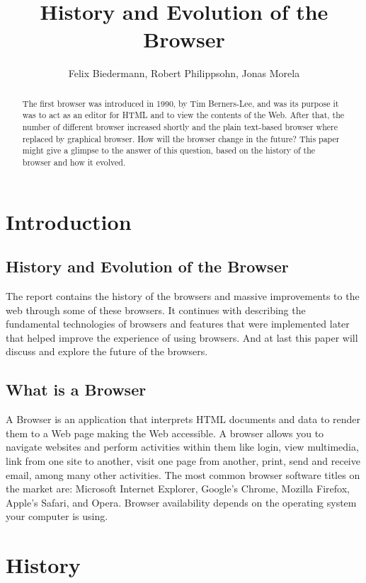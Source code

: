 \documentclass[runningheads]{llncs}
\title{History and Evolution of the Browser}
\author{Felix Biedermann, Robert Philippsohn, Jonas Morela}
\institute{University of Stuttgart, Institute for Architecture of Application Systems \\
Universitätsstraße 38, 70569 Stuttgart, Germany}
\begin{document}
\raggedbottom
\maketitle

	\begin{abstract}
		The first browser was introduced in 1990, by Tim Berners-Lee, and was its purpose it was to act as an editor for HTML and to view the contents of the Web. After that, the number of different browser increased shortly and the plain text-based browser where replaced by graphical browser. How will the browser change in the future? This paper might give a glimpse to the answer of this question, based on the history of the browser and how it evolved.
	\end{abstract}

	\section{Introduction}
		\subsection{History and Evolution of the Browser}
		The report contains the history of the browsers and massive improvements to the web through some of these browsers. It continues with describing the fundamental technologies of browsers and features that were implemented later that helped improve the experience of using browsers. And at last this paper will discuss and explore the future of the browsers.
		\subsection{What is a Browser}
		A Browser is an application that interprets HTML documents and data to render them to a Web page making the Web accessible. A browser allows you to navigate websites and perform activities within them like login, view multimedia, link from one site to another, visit one page from another, print, send and receive email, among many other activities. The most common browser software titles on the market are: Microsoft Internet Explorer, Google's Chrome, Mozilla Firefox, Apple's Safari, and Opera. Browser availability depends on the operating system your computer is using.
	\section{History}
\end{document}
